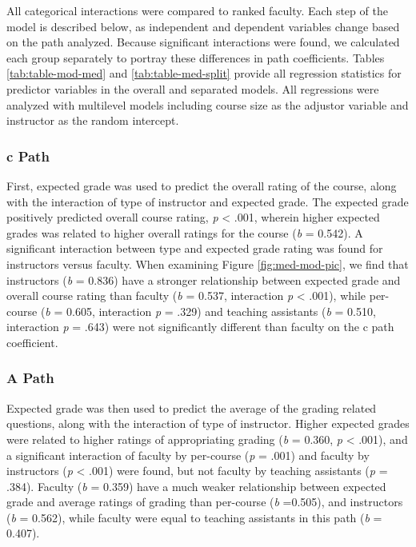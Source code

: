 \documentclass[,man,mask]{apa6}
\begin{document}
All categorical interactions were compared to ranked faculty. Each step of the model is described below, as independent and dependent variables change based on the path analyzed. Because significant interactions were found, we calculated each group separately to portray these differences in path coefficients. Tables \ref{tab:table-mod-med} and \ref{tab:table-med-split} provide all regression statistics for predictor variables in the overall and separated models. All regressions were analyzed with multilevel models including course size as the adjustor variable and instructor as the random intercept.

\hypertarget{c-path}{%
\subsubsection{c Path}\label{c-path}}

First, expected grade was used to predict the overall rating of the course, along with the interaction of type of instructor and expected grade. The expected grade positively predicted overall course rating, \emph{p} \textless{} .001, wherein higher expected grades was related to higher overall ratings for the course (\emph{b} = 0.542). A significant interaction between type and expected grade rating was found for instructors versus faculty. When examining Figure \ref{fig:med-mod-pic}, we find that instructors (\emph{b} = 0.836) have a stronger relationship between expected grade and overall course rating than faculty (\emph{b} = 0.537, interaction \emph{p} \textless{} .001), while per-course (\emph{b} = 0.605, interaction \emph{p} = .329) and teaching assistants (\emph{b} = 0.510, interaction \emph{p} = .643) were not significantly different than faculty on the c path coefficient.

\hypertarget{a-path}{%
\subsubsection{A Path}\label{a-path}}

Expected grade was then used to predict the average of the grading related questions, along with the interaction of type of instructor. Higher expected grades were related to higher ratings of appropriating grading (\emph{b} = 0.360, \emph{p} \textless{} .001), and a significant interaction of faculty by per-course (\emph{p} = .001) and faculty by instructors (\emph{p} \textless{} .001) were found, but not faculty by teaching assistants (\emph{p} = .384). Faculty (\emph{b} = 0.359) have a much weaker relationship between expected grade and average ratings of grading than per-course (\emph{b} =0.505), and instructors (\emph{b} = 0.562), while faculty were equal to teaching assistants in this path (\emph{b} = 0.407).
\end{document}
